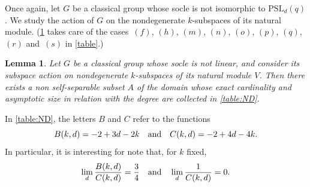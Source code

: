 \documentclass[a4paper]{amsart}
\newtheorem{lemma}[theorem]{Lemma}
\theoremstyle{definition}
\begin{document}
Once again, let $G$ be a classical group whose socle is not isomorphic to $\mathrm{PSL}_d(q)$. We study the action of $G$ on the nondegenerate $k$-subspaces of its natural module. (\cref{lem:classicalND} takes care of the cases~$(f)$, $(h)$, $(m)$, $(n)$, $(o)$, $(p)$, $(q)$, $(r)$ and~$(s)$ in \cref{table}.) 

\begin{lemma}\label{lem:classicalND}
    Let $G$ be a classical group whose socle is not linear, and consider its subspace action on nondegenerate $k$-subspaces of its natural module $V$. Then there exists a non self-separable subset $A$ of the domain whose exact cardinality and asymptotic size in relation with the degree are collected in \cref{table:ND}.
\end{lemma}
In \cref{table:ND}, the letters $B$ and $C$ refer to the functions
\[ B (k,d) = -2  + 3d -2k \quad \hbox{and} \quad C(k,d) = -2 + 4d -4k. \]
In particular, it is interesting for note that, for $k$ fixed,
\[ \lim_d \frac{B(k,d)}{C(k,d)} = \frac{3}{4} \quad \hbox{and} \quad \lim_d \frac{1}{C(k,d)}=0 . \]
\end{document}
